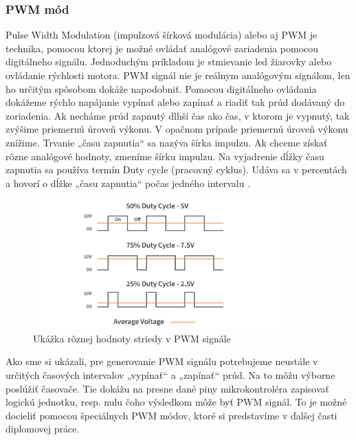\subsubsection{PWM mód}
\noindent \par
Pulse Width Modulation (impulzová šírková modulácia) alebo aj PWM je technika, pomocou ktorej je možné ovládať analógové zariadenia pomocou digitálneho signálu.
Jednoduchým príkladom je stmievanie led žiarovky alebo ovládanie rýchlosti motora. PWM signál nie je reálnym analógovým signálom, len ho určitým spôsobom dokáže napodobniť.
Pomocou digitálneho ovládania dokážeme rýchlo napájanie vypínať alebo zapínať a riadiť tak prúd dodávaný do zoriadenia. Ak necháme prúd zapnutý dlhší čas ako čas, v ktorom
je vypnutý, tak zvýšime priemernú úroveň výkonu. V opačnom prípade priemernú úroveň výkonu znížime. Trvanie „času zapnutia“ sa nazýva šírka impulzu.
Ak chceme získať rôzne analógové hodnoty, zmeníme šírku impulzu. Na vyjadrenie dĺžky času zapnutia sa používa termín Duty cycle (pracovný cyklus). Udáva sa v percentách
a hovorí o dĺžke „času zapnutia“  počas jedného intervalu \cite{WhatPWMSignal}.
\begin{figure}[!h]
    \centering
    \includegraphics[width=0.85\textwidth]{img/duty-cycle.jpg}
    \caption{Ukážka rôznej hodnoty striedy v PWM signále}
    \label{figure:pwm-signal}
\end{figure}

Ako sme si ukázali, pre generovanie PWM signálu potrebujeme neustále v určitých časových intervalov „vypínať“ a „zapínať“ prúd. Na to môžu výborne poslúžiť časovače.
Tie dokážu na presne dané piny mikrokontroléra zapisovať logickú jednotku, resp. nulu čoho výsledkom môže byť PWM signál. To je možné docieliť
pomocou špeciálnych PWM módov, ktoré si predstavíme v ďalšej časti diplomovej práce.


